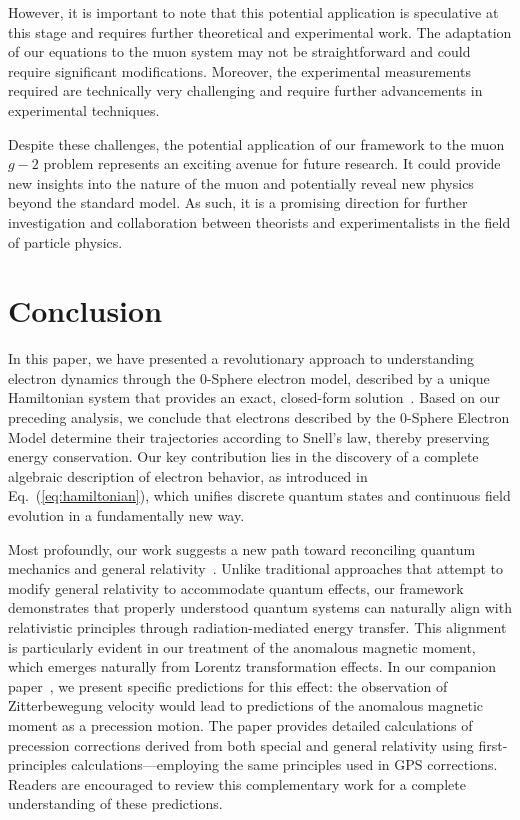 \documentclass[%
 reprint,
 amsmath,amssymb,
 aps,
]{revtex4-1}
\numberwithin{equation}{section}%
\begin{document}
However, it is important to note that this potential application is speculative at this stage and requires further theoretical and experimental work. The adaptation of our equations to the muon system may not be straightforward and could require significant modifications. Moreover, the experimental measurements required are technically very challenging and require further advancements in experimental techniques.

Despite these challenges, the potential application of our framework to the muon $g-2$ problem represents an exciting avenue for future research. It could provide new insights into the nature of the muon and potentially reveal new physics beyond the standard model. As such, it is a promising direction for further investigation and collaboration between theorists and experimentalists in the field of particle physics.


\section{\label{sec:Conclusion}Conclusion}

In this paper, we have presented a revolutionary approach to understanding electron dynamics through the 0-Sphere electron model, described by a unique Hamiltonian system that provides an exact, closed-form solution~\cite{hanamura2018, hanamura2023}. Based on our preceding analysis, we conclude that electrons described by the 0-Sphere Electron Model determine their trajectories according to Snell's law, thereby preserving energy conservation. Our key contribution lies in the discovery of a complete algebraic description of electron behavior, as introduced in Eq.~(\ref{eq:hamiltonian}), which unifies discrete quantum states and continuous field evolution in a fundamentally new way.

Most profoundly, our work suggests a new path toward reconciling quantum mechanics and general relativity~\cite{wheeler1957}. Unlike traditional approaches that attempt to modify general relativity to accommodate quantum effects, our framework demonstrates that properly understood quantum systems can naturally align with relativistic principles through radiation-mediated energy transfer. This alignment is particularly evident in our treatment of the anomalous magnetic moment, which emerges naturally from Lorentz transformation effects. In our companion paper~\cite{hanamura2023}, we present specific predictions for this effect: the observation of Zitterbewegung velocity would lead to predictions of the anomalous magnetic moment as a precession motion. The paper provides detailed calculations of precession corrections derived from both special and general relativity using first-principles calculations—employing the same principles used in GPS corrections. Readers are encouraged to review this complementary work for a complete understanding of these predictions.
\end{document}
